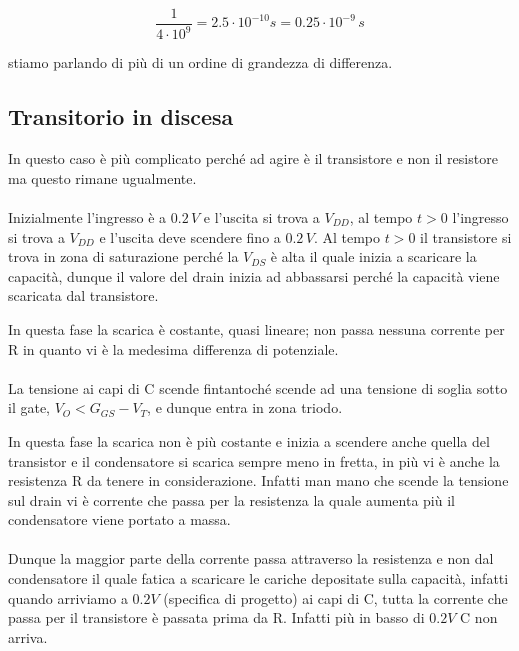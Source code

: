 \begin{equation*}
    \frac{1}{4\cdot 10^{9}} = 2.5\cdot10^{-10}s = 0.25\cdot10^{-9}\,s 
\end{equation*}

stiamo parlando di più di un ordine di grandezza di differenza.



\subsection{Transitorio in discesa}

In questo caso è più complicato perché ad agire è il transistore e non il resistore ma questo rimane ugualmente.

\paragraph{}
Inizialmente l'ingresso è a $0.2\,V$  e l'uscita si trova a $V_{DD}$, al tempo $t>0$ l'ingresso si trova a $V_{DD}$ e l'uscita deve scendere fino a $0.2\,V$. Al tempo $t>0$ il transistore si trova in zona di saturazione perché la $V_{DS}$ è alta il quale inizia a scaricare la capacità, dunque il valore del drain inizia ad abbassarsi perché la capacità viene scaricata dal transistore.

In questa fase la scarica è costante, quasi lineare; non passa nessuna corrente per R in quanto vi è la medesima differenza di potenziale.

\paragraph{}
La tensione ai capi di C scende fintantoché scende ad una tensione di soglia sotto il gate, $V_O < G_{GS} - V_T$, e dunque entra in zona triodo.


In questa fase la scarica non è più costante e inizia a scendere anche quella del transistor e il condensatore si scarica sempre meno in fretta, in più vi è anche la resistenza R da tenere in considerazione. Infatti man mano che scende la tensione sul drain vi è corrente che passa per la resistenza la quale aumenta più il condensatore viene portato a massa.

\paragraph{}
Dunque la maggior parte della corrente passa attraverso la resistenza e non dal condensatore il quale fatica a scaricare le cariche depositate sulla capacità, infatti quando arriviamo a $0.2V$ (specifica di progetto) ai capi di C, tutta la corrente che passa per il transistore è passata prima da R. Infatti più in basso di $0.2V$ C non arriva.

